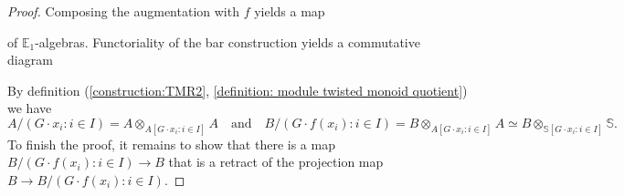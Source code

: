 \documentclass[a4paper, 10pt]{article}
\newcommand{\E}{\mathbb E}  %
\renewcommand{\S}{\mathbb S}
\theoremstyle{definition}
\begin{document}
\begin{proof}
    Composing the augmentation with $f$ yields a map
    \begin{center}
    \end{center}
    of $\E_1$-algebras. Functoriality of the bar construction yields a commutative diagram
    \begin{center}
    \end{center}
    By definition (\cref{construction:TMR2}, \cref{definition: module twisted monoid quotient}) we have 
    \[ A/(G\cdot x_i : i\in I) = A\otimes_{A [G\cdot x_i:i \in I]} A \quad \text{and} \quad B/(G\cdot f(x_i):i\in I) = B\otimes_{A [G\cdot x_i:i \in I]} A \simeq B \otimes_{\S[G \cdot x_i: i \in I]} \S. \]
    To finish the proof, it remains to show that there is a map \(B/(G\cdot f(x_i):i\in I)\to B\) that is a retract of the projection map $B \to B/(G\cdot f(x_i):i\in I)$.


\end{proof}
\end{document}
